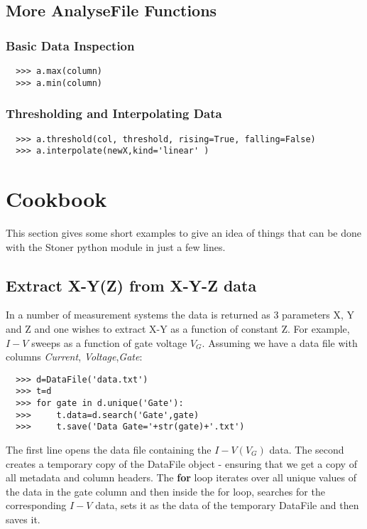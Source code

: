 \documentclass[a4paper,11pt]{scrartcl}
\begin{document}
\subsection{More AnalyseFile Functions}

\subsubsection{Basic Data Inspection}
\begin{verbatim}
  >>> a.max(column)
  >>> a.min(column)
\end{verbatim}

\subsubsection{Thresholding and Interpolating Data}
\begin{verbatim}
  >>> a.threshold(col, threshold, rising=True, falling=False)
  >>> a.interpolate(newX,kind='linear' )
\end{verbatim}

\section{Cookbook}

This section gives some short examples to give an idea of things that can be done with the Stoner python module in just a few lines.

\subsection{Extract X-Y(Z) from X-Y-Z data}

In a number of measurement systems the data is returned as 3 parameters X, Y and Z and one wishes to extract X-Y as a function of constant Z. For example, $I-V$ sweeps as a function of gate voltage $V_G$. Assuming we have a data file with columns \textit{Current}, \textit{Voltage},\textit{Gate}:

\begin{verbatim}
  >>> d=DataFile('data.txt')
  >>> t=d
  >>> for gate in d.unique('Gate'):
  >>>     t.data=d.search('Gate',gate)
  >>>     t.save('Data Gate='+str(gate)+'.txt')
\end{verbatim}

The first line opens the data file containing the $I-V(V_G)$ data. The second creates a temporary copy of the DataFile object - ensuring that we get a copy of all metadata and column headers. The \textbf{for} loop iterates over all unique values of the data in the gate column and then inside the for loop, searches for the corresponding $I-V$ data, sets it as the data of the temporary DataFile and then saves it.
\end{document}
